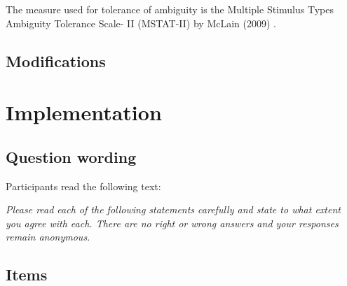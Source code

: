 \documentclass[
  letterpaper,
]{scrbook}
\begin{document}
The measure used for tolerance of ambiguity is the Multiple Stimulus
Types Ambiguity Tolerance Scale- II (MSTAT-II) by McLain (2009) .

\subsection*{Modifications}\label{modifications-14}

\section{Implementation}\label{implementation-16}

\subsection*{Question wording}\label{question-wording-16}

Participants read the following text:

\emph{Please read each of the following statements carefully and state
to what extent you agree with each. There are no right or wrong answers
and your responses remain anonymous.}

\subsection*{Items}\label{items-16}
\end{document}
